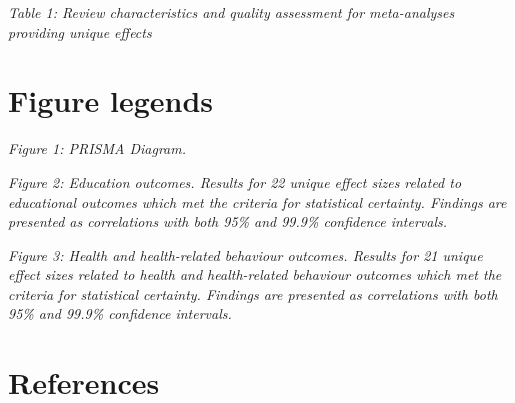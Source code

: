 \documentclass[
  english,
  man]{apa6}
\begin{document}
\emph{Table 1: Review characteristics and quality assessment for meta-analyses providing unique effects}

\hypertarget{figure-legends}{%
\section{Figure legends}\label{figure-legends}}

\emph{Figure 1: PRISMA Diagram.}

\emph{Figure 2: Education outcomes. Results for 22 unique effect sizes related to educational outcomes which met the criteria for statistical certainty. Findings are presented as correlations with both 95\% and 99.9\% confidence intervals.}

\emph{Figure 3: Health and health-related behaviour outcomes. Results for 21 unique effect sizes related to health and health-related behaviour outcomes which met the criteria for statistical certainty. Findings are presented as correlations with both 95\% and 99.9\% confidence intervals.}

\newpage

\hypertarget{references}{%
\section{References}\label{references}}
\end{document}

